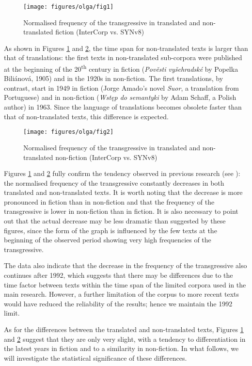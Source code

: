 \documentclass[output=paper,russian]{langsci/langscibook}
\begin{document}
\begin{figure}
  \texttt{[image: figures/olga/fig1]}
  \caption{Normalised frequency of the transgressive in translated and non-translated fiction (InterCorp vs. SYNv8)}\label{olga:f1}
\end{figure}

As shown in Figures \ref{olga:f1} and \ref{olga:f2}, the time span for non-translated texts is larger than that of translations: the first texts in non-translated sub-corpora were published at the beginning of the 20\textsuperscript{th} century in fiction (\textit{Pověsti vyšehradské} by Popelka Biliánová, 1905) and in the 1920s in non-fiction. The first translations, by contrast, start in 1949 in fiction (Jorge Amado's novel \textit{Suor}, a translation from Portuguese) and in non-fiction (\textit{Wstęp do semantyki} by Adam Schaff, a Polish author) in 1963. Since the language of translations becomes obsolete faster than that of non-translated texts, this difference is expected.

\begin{figure}
  \texttt{[image: figures/olga/fig2]}
  \caption{Normalised frequency of the transgressive in translated and non-translated non-fiction (InterCorp vs. SYNv8)}\label{olga:f2}
\end{figure}

Figures \ref{olga:f1} and \ref{olga:f2} fully confirm the tendency observed in previous research (see ): the normalised frequency of the transgressive constantly decreases in both translated and non-translated texts. It is worth noting that the decrease is more pronounced in fiction than in non-fiction and that the frequency of the transgressive is lower in non-fiction than in fiction. It is also necessary to point out that the actual decrease may be less dramatic than suggested by these figures, since the form of the graph is influenced by the few texts at the beginning of the observed period showing very high frequencies of the transgressive.

The data also indicate that the decrease in the frequency of the transgressive also continues after 1992, which suggests that there may be differences due to the time factor between texts within the time span of the limited corpora used in the main research. However, a further limitation of the corpus to more recent texts would have reduced the reliability of the results; hence we maintain the 1992 limit.

As for the differences between the translated and non-translated texts, Figures \ref{olga:f1} and \ref{olga:f2} suggest that they are only very slight, with a tendency to differentiation in the latest years in fiction and to a similarity in non-fiction. In what follows, we will investigate the statistical significance of these differences. 
\end{document}
